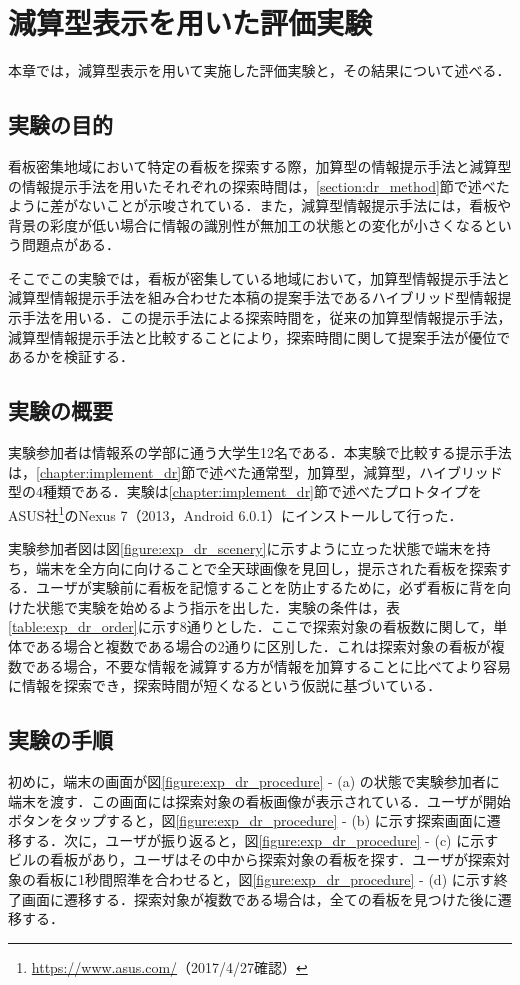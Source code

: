 \chapter{減算型表示を用いた評価実験}
\label{chapter:experiment_dr}
本章では，減算型表示を用いて実施した評価実験と，その結果について述べる．
\section{実験の目的}
  看板密集地域において特定の看板を探索する際，加算型の情報提示手法と減算型の情報提示手法を用いたそれぞれの探索時間は，\ref{section:dr_method}節で述べたように差がないことが示唆されている．また，減算型情報提示手法には，看板や背景の彩度が低い場合に情報の識別性が無加工の状態との変化が小さくなるという問題点がある．

  そこでこの実験では，看板が密集している地域において，加算型情報提示手法と減算型情報提示手法を組み合わせた本稿の提案手法であるハイブリッド型情報提示手法を用いる．この提示手法による探索時間を，従来の加算型情報提示手法，減算型情報提示手法と比較することにより，探索時間に関して提案手法が優位であるかを検証する．

\section{実験の概要}
  実験参加者は情報系の学部に通う大学生12名である．本実験で比較する提示手法は，\ref{chapter:implement_dr}節で述べた通常型，加算型，減算型，ハイブリッド型の4種類である．実験は\ref{chapter:implement_dr}節で述べたプロトタイプをASUS社\footnote{\url{https://www.asus.com/}（2017/4/27確認）}のNexus 7（2013，Android 6.0.1）にインストールして行った．

  実験参加者図は図\ref{figure:exp_dr_scenery}に示すように立った状態で端末を持ち，端末を全方向に向けることで全天球画像を見回し，提示された看板を探索する．ユーザが実験前に看板を記憶することを防止するために，必ず看板に背を向けた状態で実験を始めるよう指示を出した．実験の条件は，表\ref{table:exp_dr_order}に示す8通りとした．ここで探索対象の看板数に関して，単体である場合と複数である場合の2通りに区別した．これは探索対象の看板が複数である場合，不要な情報を減算する方が情報を加算することに比べてより容易に情報を探索でき，探索時間が短くなるという仮説に基づいている．

\section{実験の手順}
  初めに，端末の画面が図\ref{figure:exp_dr_procedure} - (a) の状態で実験参加者に端末を渡す．この画面には探索対象の看板画像が表示されている．ユーザが開始ボタンをタップすると，図\ref{figure:exp_dr_procedure} - (b) に示す探索画面に遷移する．次に，ユーザが振り返ると，図\ref{figure:exp_dr_procedure} - (c) に示すビルの看板があり，ユーザはその中から探索対象の看板を探す．ユーザが探索対象の看板に1秒間照準を合わせると，図\ref{figure:exp_dr_procedure} - (d) に示す終了画面に遷移する．探索対象が複数である場合は，全ての看板を見つけた後に遷移する．

